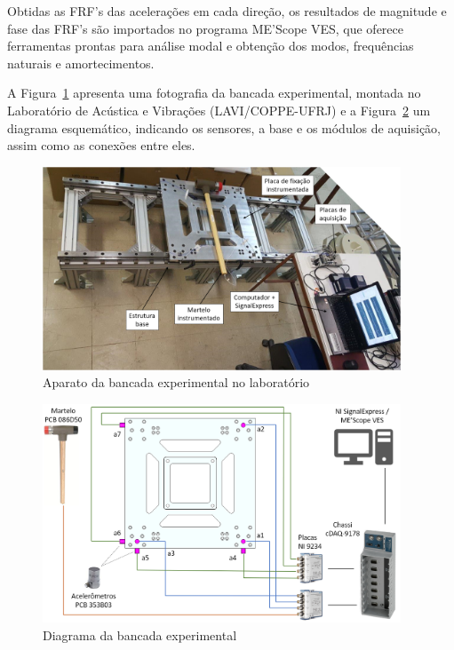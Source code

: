 Obtidas as FRF's das acelerações em cada direção, os resultados de
magnitude e fase das FRF's são importados no programa ME'Scope VES, que oferece
ferramentas prontas para análise modal e obtenção dos modos, frequências
naturais e amortecimentos.

A Figura~\ref{fig::foto_bancada} apresenta uma fotografia da bancada
experimental, montada no Laboratório de Acústica e Vibrações (LAVI/COPPE-UFRJ) e
a Figura~\ref{fig::diagrama_bancada} um diagrama esquemático, indicando os
sensores, a base e os módulos de aquisição, assim como as conexões entre eles.

\begin{figure}[h]
	\centering 
 	\includegraphics[width=0.95\textwidth]{figs/foto_bancada}
 	\caption{Aparato da bancada experimental no laboratório}
 	\label{fig::foto_bancada}
\end{figure}

\begin{figure}[h]
	\centering 
 	\includegraphics[width=0.95\textwidth]{figs/diagrama_bancada}
 	\caption{Diagrama da bancada experimental}
 	\label{fig::diagrama_bancada}
\end{figure}


